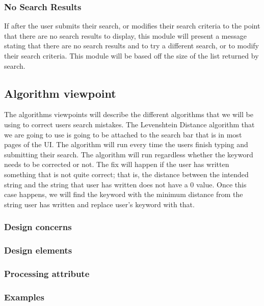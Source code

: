 \documentclass[journal,compsoc, 10pt, draftclsnofoot, onecolumn]{IEEEtran}
\begin{document}
\subsubsection*{No Search Results}
If after the user submits their search, or modifies their search criteria to the
 point that there are no search results to display, this module will present a 
message stating that there are no search results and to try a different search, 
or to modify their search criteria. This module will be based off the size of 
the list returned by search.

\subsection{Algorithm viewpoint}
The algorithms viewpoints will describe the different algorithms that we will be
 using to correct users search mistakes. The Levenshtein Distance algorithm that 
we are going to use is going to be attached to the search bar that is in most 
pages of the UI. The algorithm will run every time the users finish typing and 
submitting their search. The algorithm will run regardless whether the keyword 
needs to be corrected or not. The fix will happen if the user has written 
something that is not quite correct; that is, the distance between the intended 
string and the string that user has written does not have a 0 value. Once this 
case happens, we will find the keyword with the minimum distance from the string 
user has written and replace user's keyword with that.

\subsubsection*{Design concerns}

\subsubsection*{Design elements}

\subsubsection*{Processing attribute}

\subsubsection*{Examples}
\end{document}
